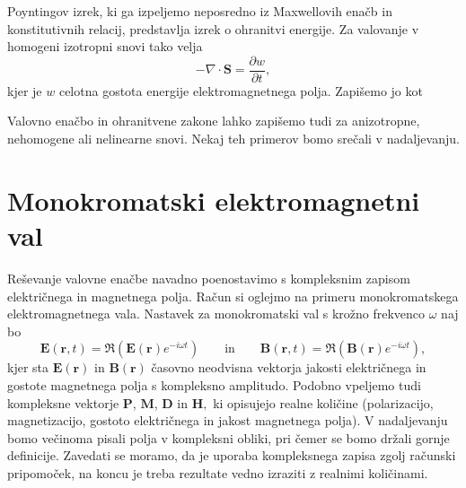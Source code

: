 Poyntingov izrek, ki ga izpeljemo neposredno 
iz Maxwellovih enačb in konstitutivnih relacij, predstavlja izrek o ohranitvi 
energije. Za valovanje v homogeni izotropni snovi tako velja
\begin{equation}
-\nabla\cdot\mathbf{S}=\frac{\partial w}{\partial t},
\end{equation}
kjer je $w$ celotna
gostota energije elektromagnetnega polja. Zapišemo jo kot 

Valovno enačbo in ohranitvene zakone lahko zapišemo tudi za anizotropne,
nehomogene ali nelinearne snovi. Nekaj teh primerov bomo srečali v nadaljevanju.

\section{Monokromatski elektromagnetni val}
Reševanje valovne enačbe navadno poenostavimo s kompleksnim
zapisom električnega in magnetnega polja. Račun si
oglejmo na primeru monokromatskega elektromagnetnega vala. Nastavek
za monokromatski val s krožno frekvenco $\omega$ naj bo
\begin{equation}
\mathbf{E}(\mathbf{r},t)  =\mathfrak{\Re}(\mathbf{E}(\mathbf{r})e^{-i\omega t})\qquad \textrm{in} \qquad
\mathbf{B}(\mathbf{r},t)  =\mathfrak{\Re}(\mathbf{B}(\mathbf{r})e^{-i\omega t}),
\label{eq:rval}
\end{equation}
kjer sta $\mathbf E(\mathbf{r})$ in $\mathbf B(\mathbf{r})$ časovno
neodvisna vektorja jakosti električnega in gostote
magnetnega polja s kompleksno
amplitudo. Podobno vpeljemo tudi kompleksne vektorje $\mathbf{P}$,
$\mathbf{M}$, $\mathbf{D}$ in $\mathbf{H},$ ki opisujejo realne količine (polarizacijo,
magnetizacijo, gostoto električnega in jakost magnetnega polja).
V nadaljevanju bomo večinoma pisali polja v kompleksni obliki, pri
čemer se bomo držali gornje definicije. Zavedati se moramo, da
je uporaba kompleksnega zapisa zgolj računski pripomoček, na koncu
je treba rezultate vedno izraziti z realnimi količinami. 


